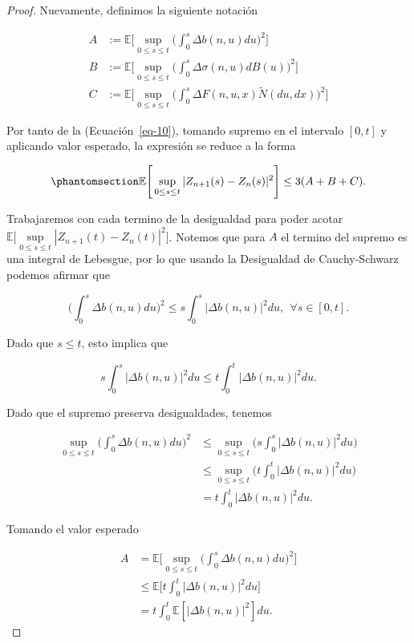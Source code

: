 \documentclass[
  spanish,
  us-letterpaper,
]{scrreprt}
\theoremstyle{plain}
\theoremstyle{plain}
\theoremstyle{plain}
\theoremstyle{definition}
\theoremstyle{remark}
\begin{document}
\begin{proof}
Nuevamente, definimos la siguiente notación

\[
    \begin{aligned}
        A & := \mathbb{E}\Bigg[\sup\limits_{0\leq s\leq t}\Bigg(\int_0^s \Delta b(n,u)du\Bigg)^2\Bigg]\\ 
        B & := \mathbb{E}\Bigg[\sup\limits_{0\leq s\leq t}\Bigg(\int_0^s \Delta \sigma(n,u)dB(u)\Bigg)^2\Bigg]\\ 
        C & := \mathbb{E}\Bigg[\sup\limits_{0\leq s\leq t}\Bigg(\int_0^s \Delta F(n,u,x)\widetilde{N}(du,dx)\Bigg)^2\Bigg]
    \end{aligned}
\]

Por tanto de la (Ecuación~\ref{eq-10}), tomando supremo en el intervalo
\([0,t]\) y aplicando valor esperado, la expresión se reduce a la forma

\begin{equation}\phantomsection\label{eq-11}{
    \mathbb{E}\Bigg[\sup\limits_{0\leq s\leq t} |Z_{n+1}(s)-Z_n(s)|^2\Bigg]\leq 3(A+B+C).
}\end{equation}

Trabajaremos con cada termino de la desigualdad para poder acotar
\(\displaystyle \mathbb{E}\Bigg[\sup\limits_{0\leq s\leq t} |Z_{n+1}(t)-Z_n(t)|^2\Bigg]\).
Notemos que para \(A\) el termino del supremo es una integral de
Lebesgue, por lo que usando la Desigualdad de Cauchy-Schwarz podemos
afirmar que

\[  
    \Bigg(\int_0^s \Delta b(n,u)du\Bigg)^2\leq s \int_0^s |\Delta b(n,u)|^2du,\ \ \forall s\in [0,t].
\]

Dado que \(s\leq t\), esto implica que

\[
    s \int_0^s |\Delta b(n,u)|^2du\leq t\int_0^t |\Delta b(n,u)|^2du.
\]

Dado que el supremo preserva desigualdades, tenemos

\[
    \begin{aligned}
            \sup\limits_{0\leq s\leq t} \Bigg(\int_0^s \Delta b(n,u)du\Bigg)^2 & \leq \sup\limits_{0\leq s\leq t}\Bigg(s \int_0^s |\Delta b(n,u)|^2du\Bigg)\\ 
            & \leq \sup\limits_{0\leq s\leq t}\Bigg(t\int_0^t |\Delta b(n,u)|^2du\Bigg)\\ 
            & = t\int_0^t |\Delta b(n,u)|^2du.
    \end{aligned}
\]

Tomando el valor esperado

\[
    \begin{aligned}
        A & = \mathbb{E}\Bigg[\sup\limits_{0\leq s\leq t}\Bigg(\int_0^s \Delta b(n,u)du\Bigg)^2\Bigg]\\ 
        & \leq \mathbb{E}\Bigg[t\int_0^t |\Delta b(n,u)|^2du\Bigg]\\ 
        & = t\int_0^t \mathbb{E}[|\Delta b(n,u)|^2]du.
    \end{aligned}
\]


\end{proof}
\end{document}
